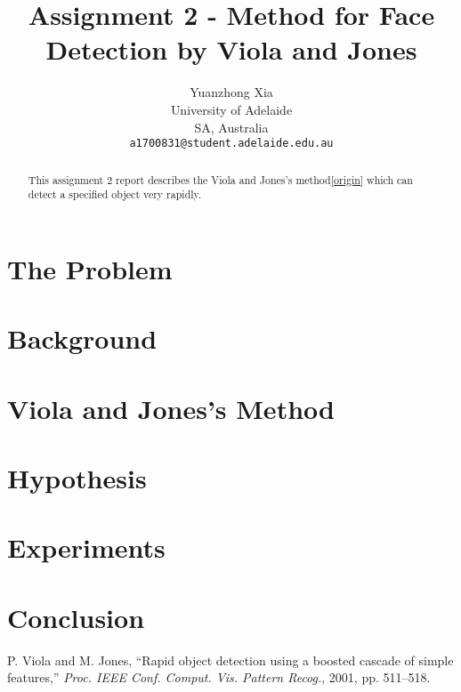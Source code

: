 \documentclass[10pt,twocolumn,letterpaper]{article}
\begin{document}
\title{Assignment 2 - Method for Face Detection by Viola and Jones}
\author{Yuanzhong Xia\\
University of Adelaide\\
SA, Australia\\
{\tt\small a1700831@student.adelaide.edu.au}
}
\maketitle

\begin{abstract}
This assignment 2 report describes the Viola and Jones's method{\ref{origin}} which can detect a specified object very rapidly.


\end{abstract}


\section{The Problem}

\section{Background}

\section{Viola and Jones's Method}

\section{Hypothesis}

\section{Experiments}

\section{Conclusion}

\begin{thebibliography}{9}
P. Viola and M. Jones, ``Rapid object detection using a boosted cascade of simple features,''
\textit{Proc. IEEE Conf. Comput. Vis. Pattern Recog.}, 2001, pp. 511–518.

\end{thebibliography}
\end{document}
